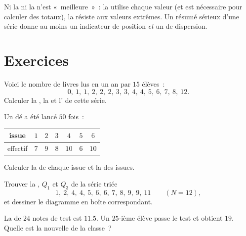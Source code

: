 \begin{remark}
Ni la  ni la  n'est «~meilleure~»~: la  utilise
chaque valeur (et est nécessaire pour calculer des totaux), la 
résiste aux valeurs extrêmes. Un résumé sérieux d'une série donne au
moins un indicateur de position \emph{et} un de dispersion.
\end{remark}

\section{Exercices}

\begin{exercise}[$\star$]\label{exo:g10:stats:1}
Voici le nombre de livres lus en un an par $15$ élèves~:
\[
0,\ 1,\ 1,\ 2,\ 2,\ 2,\ 3,\ 3,\ 4,\ 4,\ 5,\ 6,\ 7,\ 8,\ 12 .
\]
Calculer la , la  et l' de cette série.
\end{exercise}

\begin{exercise}[$\star$]\label{exo:g10:stats:2}
Un dé a été lancé $50$ fois~:
\begin{center}
\renewcommand{\arraystretch}{1.2}
\begin{tabular}{c|cccccc}
issue & $1$ & $2$ & $3$ & $4$ & $5$ & $6$ \\
\hline
effectif & $7$ & $9$ & $8$ & $10$ & $6$ & $10$ \\
\end{tabular}
\end{center}
Calculer la  de chaque issue et la  des issues.
\end{exercise}

\begin{exercise}[$\star$]\label{exo:g10:stats:3}
Trouver la , $Q_1$ et $Q_3$ de la série triée
\[
1,\ 2,\ 4,\ 4,\ 5,\ 6,\ 6,\ 7,\ 8,\ 9,\ 9,\ 11 \qquad (N = 12),
\]
et dessiner le diagramme en boîte correspondant.
\end{exercise}

\begin{exercise}[$\star$]\label{exo:g10:stats:4}
La  de $24$ notes de test est $11.5$. Un $25$-ième élève passe le
test et obtient $19$. Quelle est la nouvelle  de la classe~?
\end{exercise}

